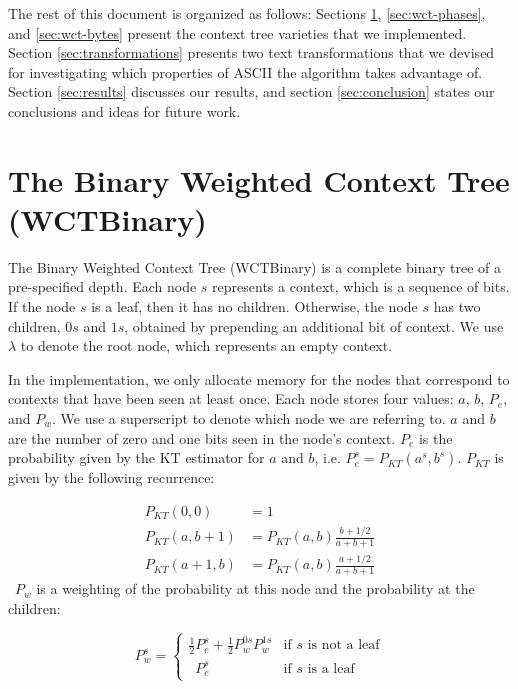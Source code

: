 \documentclass[11pt]{scrartcl}
\begin{document}
The rest of this document is organized as follows: Sections
\ref{sec:wct-binary}, \ref{sec:wct-phases}, and \ref{sec:wct-bytes} present the
context tree varieties that we implemented. Section \ref{sec:transformations}
presents two text transformations that we devised for investigating which
properties of ASCII the algorithm takes advantage of. Section \ref{sec:results}
discusses our results, and section \ref{sec:conclusion} states our conclusions
and ideas for future work.


\section{The Binary Weighted Context Tree (WCTBinary)}
\label{sec:wct-binary}

The Binary Weighted Context Tree (WCTBinary) is a complete binary tree of a
pre-specified depth. Each node $s$ represents a context, which is a sequence of
bits. If the node $s$ is a leaf, then it has no children. Otherwise, the node
$s$ has two children, $0s$ and $1s$, obtained by prepending an additional bit
of context.  We use $\lambda$ to denote the root node, which represents an
empty context.

In the implementation, we only allocate memory for the nodes that correspond to
contexts that have been seen at least once. Each node stores four values: $a$,
$b$, $P_e$, and $P_w$. We use a superscript to denote which node we are
referring to. $a$ and $b$ are the number of zero and one bits seen in the
node's context. $P_e$ is the probability given by the KT estimator for $a$ and
$b$, i.e. $P_e^s = P_{KT}(a^s, b^s)$. $P_{KT}$ is given by the following
recurrence:

\begin{align*}
P_{KT}(0, 0)   &= 1 \\
P_{KT}(a, b+1) &= P_{KT}(a, b) \frac{b + 1/2}{a + b + 1} \\
P_{KT}(a+1, b) &= P_{KT}(a, b) \frac{a + 1/2}{a + b + 1}
\end{align*}
\
$P_w$ is a weighting of the probability at this node and the probability at the
children:

\[
P_w^s =
\left\{
\begin{array}{ll}
\frac{1}{2} P_e^s + \frac{1}{2} P_w^{0s} P_w^{1s}
    & \mbox{if $s$ is not a leaf} \\
\phantom{\frac{1}{2}} P_e^s
    & \mbox{if $s$ is a leaf}
\end{array}
\right.
\]
\end{document}
